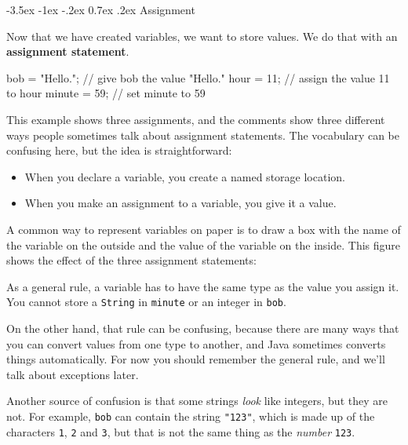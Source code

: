 \documentclass{book}
\makeatletter
\renewcommand{\section}{\@startsection 
    {section} {1} {0mm}%
    {-3.5ex \@plus -1ex \@minus -.2ex}%
    {0.7ex \@plus.2ex}%
    {\normalfont\Large\bfseries}}
\makeatother
\begin{document}
\section{Assignment}

Now that we have created variables, we want to
store values.  We do that with an {\bf assignment
statement}.

\begin{verbatimtab}
    bob = "Hello.";     // give bob the value "Hello."
    hour = 11;           // assign the value 11 to hour
    minute = 59;         // set minute to 59
\end{verbatimtab}
%
This example shows three assignments, and the comments show
three different ways people sometimes talk about assignment
statements.  The vocabulary can be confusing here, but the
idea is straightforward:

\begin{itemize}

\item When you declare a variable, you create a named storage location.

\item When you make an assignment to a variable, you give it a value.

\end{itemize}

A common way to represent variables on paper is to draw a box
with the name of the variable on the outside and the value
of the variable on the inside.  This figure shows
the effect of the three assignment statements:




As a general rule,
a variable has to have the same type as the
value you assign it.  You cannot store a {\tt String} in {\tt minute} or an
integer in {\tt bob}.

On the other hand, that rule can be confusing, because there are many
ways that you can convert values from one type to another, and Java
sometimes converts things automatically.  For now you should
remember the general rule, and we'll talk about exceptions later.

Another source of confusion is that some strings {\em look}
like integers, but they are not.  For example, {\tt bob}
can contain the string {\tt "123"}, which is made up of the
characters {\tt 1}, {\tt 2} and {\tt 3}, but that is not
the same thing as the {\em number} {\tt 123}.
\end{document}
